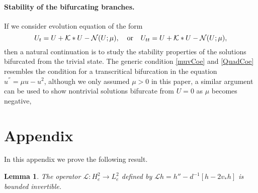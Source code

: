 \documentclass[letterpaper,11pt]{article}
\newcommand{\Nl}{\mathcal{N}}
\newcommand{\K}{\mathcal{K}}
\newcommand{\cL}{\mathcal{L}}
\numberwithin{equation}{section}
\theoremstyle{plain}
\newtheorem{lemma}[theorem]{Lemma}
\theoremstyle{remark}
\begin{document}
\paragraph{Stability of the bifurcating branches.}
If we consider evolution equation of the form \[U_t = U+\K\ast U-\Nl(U;\mu), \hspace{0.1in}\text{ or }\hspace{0.1in} U_{tt} =U+\K\ast U-\Nl(U;\mu),\] then a natural continuation is to study the stability properties of the solutions bifurcated from the trivial state. The generic condition \eqref{muvCoe} and \eqref{QuadCoe} resembles the condition for a transcritical bifurcation in the equation $u^{''}=\mu u-u^2$, although we only assumed $\mu>0$ in this paper, a similar argument can be used to show nontrivial solutions bifurcate from $U=0$ as $\mu$ becomes negative, 
\section*{Appendix}
In this appendix we prove the following result.
\begin{lemma}\label{Nondegen}
The operator $\cL : H^2_e \to L^2_e$ defined by  $\cL h =  h''-d^{-1}[h-2v_*h]$ is bounded invertible.
\end{lemma}
\end{document}
